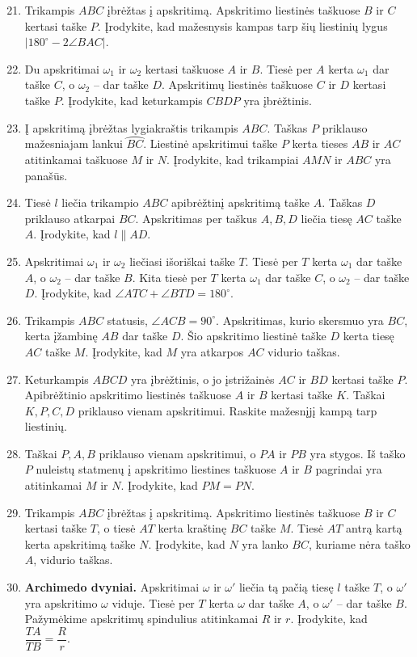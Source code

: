 \documentclass[11pt,a4paper]{scrartcl}
\begin{document}
\begin{enumerate}
    \setcounter{enumi}{20}
    \item Trikampis $ABC$ įbrėžtas į apskritimą. Apskritimo liestinės taškuose $B$ ir $C$ kertasi taške $P$. Įrodykite, kad mažesnysis kampas tarp šių liestinių lygus $\lvert180^\circ-2\angle BAC\rvert$.
    \item Du apskritimai $\omega_1$ ir $\omega_2$ kertasi taškuose $A$ ir $B$. Tiesė per $A$ kerta $\omega_1$ dar taške $C$, o $\omega_2$ – dar taške $D$. Apskritimų liestinės taškuose $C$ ir $D$ kertasi taške $P$. Įrodykite, kad keturkampis $CBDP$ yra įbrėžtinis.
    \item Į apskritimą įbrėžtas lygiakraštis trikampis $ABC$. Taškas $P$ priklauso mažesniajam lankui $\wideparen{BC}$. Liestinė apskritimui taške $P$ kerta tieses $AB$ ir $AC$ atitinkamai taškuose $M$ ir $N$. Įrodykite, kad trikampiai $AMN$ ir $ABC$ yra panašūs.
    \item Tiesė $l$ liečia trikampio $ABC$ apibrėžtinį apskritimą taške $A$. Taškas $D$ priklauso atkarpai $BC$. Apskritimas per taškus $A,B,D$ liečia tiesę $AC$ taške $A$. Įrodykite, kad $l\parallel AD$.
    \item Apskritimai $\omega_1$ ir $\omega_2$ liečiasi išoriškai taške $T$. Tiesė per $T$ kerta $\omega_1$ dar taške $A$, o $\omega_2$ – dar taške $B$. Kita tiesė per $T$ kerta $\omega_1$ dar taške $C$, o $\omega_2$ – dar taške $D$. Įrodykite, kad $\angle ATC+\angle BTD=180^\circ$.
    \item Trikampis $ABC$ statusis, $\angle ACB=90^\circ$. Apskritimas, kurio skersmuo yra $BC$, kerta įžambinę $AB$ dar taške $D$. Šio apskritimo liestinė taške $D$ kerta tiesę $AC$ taške $M$. Įrodykite, kad $M$ yra atkarpos $AC$ vidurio taškas.
    \item Keturkampis $ABCD$ yra įbrėžtinis, o jo įstrižainės $AC$ ir $BD$ kertasi taške $P$. Apibrėžtinio apskritimo liestinės taškuose $A$ ir $B$ kertasi taške $K$. Taškai $K,P,C,D$ priklauso vienam apskritimui. Raskite mažesnįjį kampą tarp liestinių.
    \item Taškai $P,A,B$ priklauso vienam apskritimui, o $PA$ ir $PB$ yra stygos. Iš taško $P$ nuleistų statmenų į apskritimo liestines taškuose $A$ ir $B$ pagrindai yra atitinkamai $M$ ir $N$. Įrodykite, kad $PM=PN$.
    \item Trikampis $ABC$ įbrėžtas į apskritimą. Apskritimo liestinės taškuose $B$ ir $C$ kertasi taške $T$, o tiesė $AT$ kerta kraštinę $BC$ taške $M$. Tiesė $AT$ antrą kartą kerta apskritimą taške $N$. Įrodykite, kad $N$ yra lanko $BC$, kuriame nėra taško $A$, vidurio taškas.
    \item \textbf{Archimedo dvyniai.} Apskritimai $\omega$ ir $\omega'$ liečia tą pačią tiesę $l$ taške $T$, o $\omega'$ yra apskritimo $\omega$ viduje. Tiesė per $T$ kerta $\omega$ dar taške $A$, o $\omega'$ – dar taške $B$. Pažymėkime apskritimų spindulius atitinkamai $R$ ir $r$. Įrodykite, kad $\dfrac{TA}{TB}=\dfrac{R}{r}$.
\end{enumerate}
\end{document}

